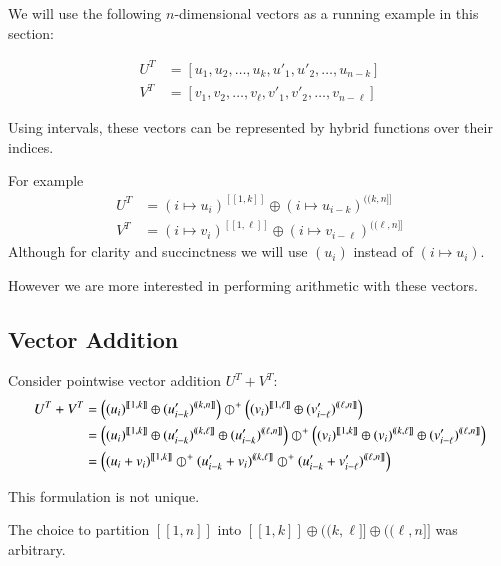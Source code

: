 
We will use the following $n$-dimensional vectors as a running example in this section:

\begin{align}
	U^T &= [ u_1, u_2, \ldots, u_{k}, u'_1, u'_2, \ldots, u_{n-k} ] \\
	V^T &= [ v_1, v_2, \ldots, v_{\ell}, v'_1, v'_2, \ldots, v_{n-\ell} ]
\end{align}

Using intervals, these vectors can be represented by hybrid functions over their indices.

For example
\begin{align}
	U^T &= (i \mapsto u_i)^{[\![1, k]\!]} \oplus (i \mapsto u_{i-k})^{(\!(k,n]\!]} \\
	V^T &= (i \mapsto v_i)^{[\![1, \ell]\!]} \oplus (i \mapsto v_{i-\ell})^{(\!(\ell,n]\!]}
\end{align}
Although for clarity and succinctness we will use $(u_i)$ instead of $(i \mapsto u_i)$.

However we are more interested in performing arithmetic with these vectors.




\subsection{Vector Addition}

Consider pointwise vector addition $U^T + V^T$:
\begin{align}
	U^T + V^T 
	&= \left( (u_i)^{[\![1, k]\!]} \oplus (u'_{i-k})^{(\!(k,n]\!]} \right) 
		\hjoin[+] 
		\left( (v_i)^{[\![1, \ell]\!]} \oplus (v'_{i-\ell})^{(\!(\ell,n]\!]} \right) \\
	&= \left( (u_i)^{[\![1, k]\!]} \oplus (u'_{i-k})^{(\!(k,\ell]\!]} \oplus (u'_{i-k})^{(\!(\ell,n]\!]} \right) 
		\hjoin[+]
		\left( (v_i)^{[\![1, k]\!]} \oplus (v_i)^{(\!(k, \ell]\!]} \oplus (v'_{i-\ell})^{(\!(\ell,n]\!]} \right) \\
	&= \left( (u_i + v_i)^{[\![1, k]\!]} 
		\hjoin[+] (u'_{i-k} + v_i)^{(\!(k,\ell]\!]} 
		\hjoin[+] (u'_{i-k}+v'_{i-\ell})^{(\!(\ell,n]\!]} \right)
\end{align}

This formulation is not unique.

The choice to partition $[\![1,n]\!]$ into $[\![1,k]\!] \oplus (\!(k,\ell]\!] \oplus (\!(\ell, n]\!]$ was arbitrary.

